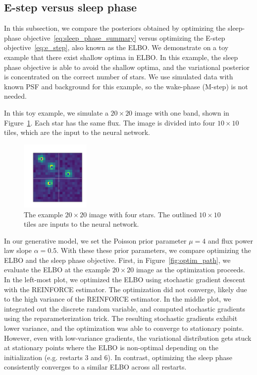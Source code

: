 \subsection{E-step versus sleep phase}
\label{sec:estep_sleep_compare}

In this subsection, we compare the posteriors obtained by optimizing the sleep-phase objective~\eqref{eq:sleep_phase_summary} 
versus optimizing the E-step objective~\eqref{eq:e_step}, also known as the ELBO. 
We demonstrate on a toy example that there exist shallow optima in ELBO. In this example, the sleep phase objective is able to avoid the shallow optima, and the variational posterior is concentrated on the correct number of stars. We use simulated data with known PSF and background for this example, so the wake-phase (M-step) is not needed. 

In this toy example, we simulate a $20\times20$ image with one band, shown in Figure~\ref{fig:toy_example}. Each star has the same flux. The image is divided into four $10\times 10$ tiles, which are the input to the neural network. 
\begin{figure}[!h]
    \centering
    \vspace{-1em}
    \includegraphics[width = 0.3\textwidth]{figures/vi_sleep_ex_figure.png}
    \vspace{-1.7em}
    \caption{The example $20\times 20$ image with four stars. The outlined $10\times 10$ tiles are inputs to the neural network. }
    \label{fig:toy_example}
\end{figure}

In our generative model, we set the Poisson prior parameter $\mu = 4$ and flux power law slope $\alpha = 0.5$. With these these prior parameters, we compare optimizing the ELBO and the sleep phase objective. First, in Figure~\ref{fig:optim_path}, we evaluate the ELBO at the example $20\times 20$ image as the optimization proceeds. In the left-most plot, we optimized the ELBO using stochastic gradient descent with the REINFORCE estimator. The optimization did not converge, likely due to the high variance of the REINFORCE estimator. In the middle plot, we integrated out the discrete random variable, and computed stochastic gradients using the reparameterization trick. The resulting stochastic gradients exhibit lower variance, and the optimization was able to converge to stationary points. However, even with low-variance gradients, the variational distribution gets stuck at stationary points where the ELBO is non-optimal depending on the initialization (e.g. restarts 3 and 6). In contrast, optimizing the sleep phase consistently converges to a similar ELBO across all restarts. 

